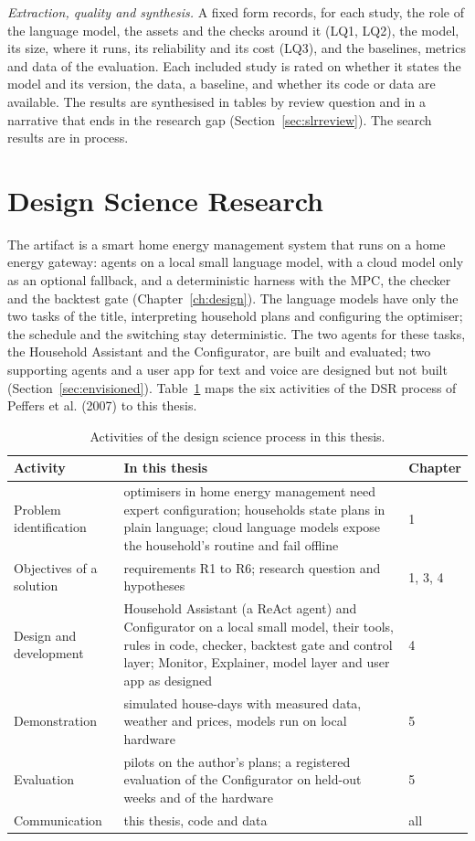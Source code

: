 \documentclass[12pt,a4paper]{report}
\begin{document}
\textit{Extraction, quality and synthesis.} A fixed form records, for each study,
the role of the language model, the assets and the checks around it
(LQ1, LQ2), the model, its size, where it runs, its reliability and its
cost (LQ3), and the baselines, metrics and data of the evaluation. Each
included study is rated on whether it states the model and its version,
the data, a baseline, and whether its code or data are available. The results are synthesised in tables by
review question and in a narrative that ends in the research gap
(Section~\ref{sec:slrreview}). The search results are in process.

\section{Design Science Research}
\label{sec:dsr}

The artifact is a smart home energy management system that runs on a
home energy gateway: agents on a local small language model, with a
cloud model only as an optional fallback, and a deterministic harness
with the MPC, the checker and the backtest gate
(Chapter~\ref{ch:design}). The language models have only the two
tasks of the title, interpreting household plans and configuring the
optimiser; the schedule and the switching stay deterministic. The two
agents for these tasks, the Household Assistant and the Configurator,
are built and evaluated; two supporting agents and a user app for text
and voice are designed but not built (Section~\ref{sec:envisioned}).
Table~\ref{tab:dsrsteps} maps the six activities of the DSR process of
Peffers et al. (2007) to this thesis.

\begin{table}[htbp]
\caption{Activities of the design science process in this thesis.}
\label{tab:dsrsteps}
\small
\begin{tabularx}{\textwidth}{@{}>{\raggedright\arraybackslash}p{3.6cm}Xp{1.8cm}@{}}
\toprule
Activity & In this thesis & Chapter \\
\midrule
Problem identification & optimisers in home energy management need expert configuration; households state plans in plain language; cloud language models expose the household's routine and fail offline & 1 \\
Objectives of a solution & requirements R1 to R6; research question and hypotheses & 1, 3, 4 \\
Design and development & Household Assistant (a ReAct agent) and Configurator on a local small model, their tools, rules in code, checker, backtest gate and control layer; Monitor, Explainer, model layer and user app as designed & 4 \\
Demonstration & simulated house-days with measured data, weather and prices, models run on local hardware & 5 \\
Evaluation & pilots on the author's plans; a registered evaluation of the Configurator on held-out weeks and of the hardware & 5 \\
Communication & this thesis, code and data & all \\
\bottomrule
\end{tabularx}
\end{table}
\end{document}
